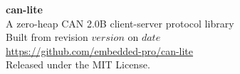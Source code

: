 \cleardoublepage
\thispagestyle{empty}
\vspace*{\fill}
\begin{center}
{\large\bfseries can-lite}\\[0.4em]
A zero-heap CAN 2.0B client-server protocol library\\[1.2em]
Built from revision \texttt{$version$} on $date$\\[0.4em]
\url{https://github.com/embedded-pro/can-lite}\\[1.2em]
Released under the MIT License.
\end{center}
\vspace*{\fill}
